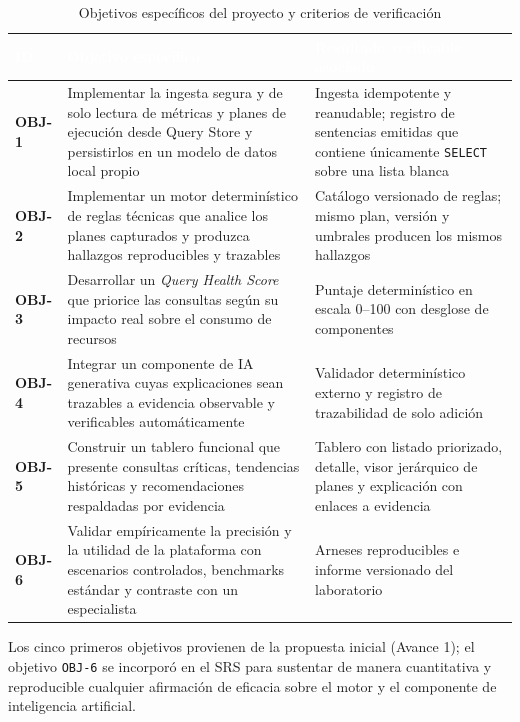 \documentclass[12pt,a4paper]{article}
\begin{document}
\begingroup
{}
\begin{table}[H]
\centering
\small
\begin{tabularx}{\textwidth}{>{\bfseries}p{} p{} X}
\toprule
\rowcolor{utbblue}
\textcolor{white}{\textbf{ID}} & \textcolor{white}{\textbf{Objetivo específico}} & \textcolor{white}{\textbf{Resultado verificable asociado}} \\
\midrule
OBJ-1 & Implementar la ingesta segura y de solo lectura de métricas y planes de ejecución desde Query Store y persistirlos en un modelo de datos local propio & Ingesta idempotente y reanudable; registro de sentencias emitidas que contiene únicamente \texttt{SELECT} sobre una lista blanca \\
OBJ-2 & Implementar un motor determinístico de reglas técnicas que analice los planes capturados y produzca hallazgos reproducibles y trazables & Catálogo versionado de reglas; mismo plan, versión y umbrales producen los mismos hallazgos \\
OBJ-3 & Desarrollar un \textit{Query Health Score} que priorice las consultas según su impacto real sobre el consumo de recursos & Puntaje determinístico en escala 0--100 con desglose de componentes \\
OBJ-4 & Integrar un componente de IA generativa cuyas explicaciones sean trazables a evidencia observable y verificables automáticamente & Validador determinístico externo y registro de trazabilidad de solo adición \\
OBJ-5 & Construir un tablero funcional que presente consultas críticas, tendencias históricas y recomendaciones respaldadas por evidencia & Tablero con listado priorizado, detalle, visor jerárquico de planes y explicación con enlaces a evidencia \\
OBJ-6 & Validar empíricamente la precisión y la utilidad de la plataforma con escenarios controlados, benchmarks estándar y contraste con un especialista & Arneses reproducibles e informe versionado del laboratorio \\
\bottomrule
\end{tabularx}
\caption{Objetivos específicos del proyecto y criterios de verificación}
\label{tab:objetivos}
\end{table}
\endgroup

Los cinco primeros objetivos provienen de la propuesta inicial (Avance 1); el objetivo \texttt{OBJ-6} se incorporó en el SRS para sustentar de manera cuantitativa y reproducible cualquier afirmación de eficacia sobre el motor y el componente de inteligencia artificial.
\end{document}
